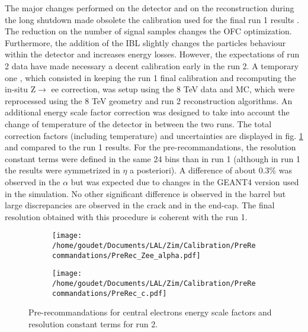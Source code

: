 \label{sec:Calibration_inSitu_secPreRec}
The major changes performed on the detector and on the reconstruction during the long shutdown made obsolete the calibration used for the final run 1 results \cite{CERN-PH-EP-2014-153}.
The reduction on the number of signal samples changes the OFC optimization.
Furthermore, the addition of the IBL slightly changes the particles behaviour within the detector and increases energy losses.
However, the expectations of run 2 data have made necessary a decent calibration early in the run 2.
A temporary one \cite{ATL-COM-PHYS-2015-1300,ATL-COM-PHYS-2016-841,ATL-COM-PHYS-2017-757}, which consisted in keeping the run 1 final calibration and recomputing the in-situ Z\(\rightarrow\) ee correction, was setup using the 8 TeV data and MC, which were reprocessed using the 8 TeV geometry and run 2 reconstruction algorithms.
An additional energy scale factor correction was designed to take into account the change of temperature of the detector in between the two runs.
The total correction factors (including temperature) and uncertainties are displayed in fig. \ref{orgb377ac3} and compared to the run 1 results.
For the pre-recommandations, the resolution constant terms were defined in the same 24 bins than in run 1 (although in run 1 the results were symmetrized in $\eta$ a posteriori).
A difference of about 0.3\% was observed in the \(\alpha\) but was expected due to changes in the GEANT4 version used in the simulation.
No other significant difference is observed in the barrel but large discrepancies are observed in the crack and in the end-cap.
The final resolution obtained with this procedure is coherent with the run 1.

\begin{figure}
\begin{subfigure}[t]{0.49\linewidth}
\begin{center}
\texttt{[image: /home/goudet/Documents/LAL/Zim/Calibration/PreRecommandations/PreRec\_Zee\_alpha.pdf]}
\end{center}
\end{subfigure}
\begin{subfigure}[t]{0.49\linewidth}
\begin{center}
\texttt{[image: /home/goudet/Documents/LAL/Zim/Calibration/PreRecommandations/PreRec\_c.pdf]}
\end{center}
\end{subfigure}
\caption{\label{orgb377ac3}
Pre-recommandations for central electrons energy scale factors and resolution constant terms for run 2.}
\end{figure}

